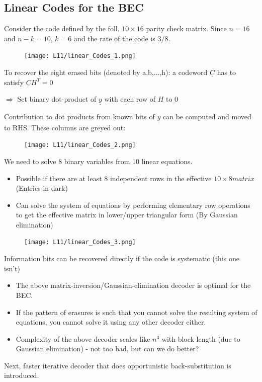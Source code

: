 \documentclass[12pt]{article}
\begin{document}
\subsection{Linear Codes for the BEC}
Consider the code defined by the foll. $10\times 16$ parity check matrix. Since $n=16$ and $n-k=10$, $k=6$ and the rate of the code is $3/8$.
\begin{figure}[H]
    \centering
    \texttt{[image: L11/linear\_Codes\_1.png]}
\end{figure}
To recover the eight erased bits (denoted by a,b,...,h): 
a codeword $\underline{C}$ has to satisfy $\underline{C}H^T=0$

$\Rightarrow$ Set binary dot-product of $\underline{y}$ with each row of $H$ to 0
\vspace{\baselineskip} 

Contribution to dot products from known bits of $\underline{y}$ can be computed and moved to RHS. These columns are greyed out:
\begin{figure}[H]
    \centering
    \texttt{[image: L11/linear\_Codes\_2.png]}
\end{figure}
We need to solve 8 binary variables from 10 linear equations.
\begin{itemize}
    \item Possible if there are at least 8 independent rows in the effective $10 \times 8 matrix$ (Entries in dark)
    \item Can solve the system of equations by performing elementary row operations to get the effective matrix in lower/upper triangular form (By Gaussian elimination)
\end{itemize}
\begin{figure}[H]
    \centering
    \texttt{[image: L11/linear\_Codes\_3.png]}
\end{figure}
Information bits can be recovered directly if the code is systematic (this one isn't)
\begin{itemize}
    \item The above matrix-inversion/Gaussian-elimination decoder is optimal for the BEC.
    \item If the pattern of erasures is such that you cannot solve the resulting system of equations, you cannot solve it using any other decoder either.
    \item Complexity of the above decoder scales like $n^3$ with block length (due to Gaussian elimination) - not too bad, but can we do better?
\end{itemize}
Next, faster iterative decoder that does opportunistic back-substitution is introduced.
\end{document}
